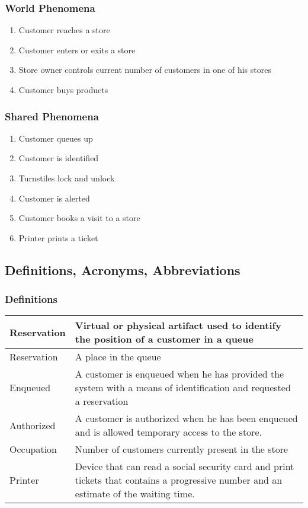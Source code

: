 \subsubsection{World Phenomena}
\begin{enumerate}[label=WP\arabic*]
	\item Customer reaches a store
	\item Customer enters or exits a store
	\item Store owner controls current number of customers in one of his stores
	\item Customer buys products
\end{enumerate}
\subsubsection{Shared Phenomena}
\begin{enumerate}[label=SP\arabic*]
	\item Customer queues up
	\item Customer is identified %
	\item Turnstiles lock and unlock
	\item Customer is alerted%
	\item Customer books a visit to a store
	\item Printer prints a ticket
\end{enumerate}
\subsection{Definitions, Acronyms, Abbreviations}
\subsubsection{Definitions}
\begin{tabular}{ | m{5cm} | m{10cm} | }
	\hline
	Reservation & Virtual or physical artifact used to identify the position of a customer in a queue \\
	\hline
	Reservation & A place in the queue\\
	\hline
	Enqueued & A customer is enqueued when he has provided the system with a means of identification and requested a reservation\\
	\hline
	Authorized & A customer is authorized when he has been enqueued and is allowed temporary access to the store.\\
	\hline
	Occupation & Number of customers currently present in the store\\
	\hline
	Printer & Device that can read a social security card and print tickets that contains a progressive number and an estimate of the waiting time.\\
	\hline
\end{tabular}
